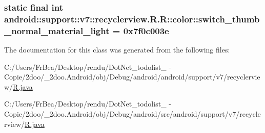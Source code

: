 \hypertarget{classandroid_1_1support_1_1v7_1_1recyclerview_1_1_r_1_1color_12310534aed6861c1ab7a21c3491b0aa}{
\subsubsection[{switch\_\-thumb\_\-normal\_\-material\_\-light}]{\setlength{\rightskip}{0pt plus 5cm}static final int android::support::v7::recyclerview.R.R::color::switch\_\-thumb\_\-normal\_\-material\_\-light = 0x7f0c003e}}
\label{classandroid_1_1support_1_1v7_1_1recyclerview_1_1_r_1_1color_12310534aed6861c1ab7a21c3491b0aa}




The documentation for this class was generated from the following files:\begin{CompactItemize}
\item 
C:/Users/FrBea/Desktop/rendu/DotNet\_\-todolist\_ - Copie/2doo/\_\-2doo.Android/obj/Debug/android/android/support/v7/recyclerview/\hyperlink{android_2support_2v7_2recyclerview_2_r_8java}{R.java}\item 
C:/Users/FrBea/Desktop/rendu/DotNet\_\-todolist\_ - Copie/2doo/\_\-2doo.Android/obj/Debug/android/src/android/support/v7/recyclerview/\hyperlink{src_2android_2support_2v7_2recyclerview_2_r_8java}{R.java}\end{CompactItemize}
